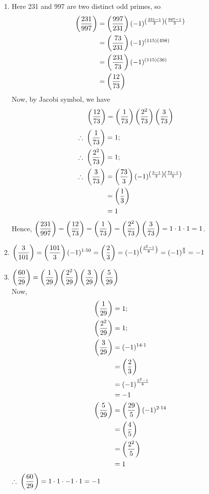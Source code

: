 \documentclass[12pt,class=book,crop=false]{standalone}
\begin{document}
\begin{soln}
    \hfill
    \begin{enumerate}
        \item Here 231 and 997 are two distinct odd primes, so
        \begin{align*}
            \left( \frac{231}{997} \right)&=\left( \frac{997}{231} \right)(-1)^{\left( \frac{231-1}{2} \right)\left( \frac{997-1}{2} \right)}\\
            &=\left( \frac{73}{231} \right)(-1)^{(115)(498)}\\
            &=\left( \frac{231}{73} \right)(-1)^{(115)(36)}\\
            &=\left( \frac{12}{73} \right)
        \end{align*}
        Now, by Jacobi symbol, we have
        \[\left( \frac{12}{73} \right)=\left( \frac{1}{73} \right)\left( \frac{2^2}{73} \right)\left( \frac{3}{73} \right)\]
        \begin{align*}
            \therefore\;\left( \frac{1}{73} \right)&=1;\\
            \therefore\;\left( \frac{2^2}{73} \right)&=1;\\
            \therefore\;\left( \frac{3}{73} \right)&=\left( \frac{73}{3} \right)(-1)^{\left( \frac{3-1}{2} \right)\left( \frac{73-1}{2} \right)}\\
            &=\left( \frac{1}{3} \right)\\
            &=1
        \end{align*}
        Hence, $ \displaystyle \left( \frac{231}{997} \right)=\left( \frac{12}{73} \right)=\left( \frac{1}{73} \right)=\left( \frac{2^2}{73} \right)\left( \frac{3}{73} \right)=1\cdot1\cdot1=1 $.
        \item $ \displaystyle \left( \frac{3}{101} \right)=\left( \frac{101}{3} \right)(-1)^{1\cdot 50}=\left( \frac{2}{3} \right)=(-1)^{\left( \frac{3^2-1}{8} \right)}=(-1)^{\frac{8}{9}}=-1 $
        \item $ \displaystyle \left( \frac{60}{29} \right)=\left( \frac{1}{29} \right)\left( \frac{2^2}{29} \right)\left( \frac{3}{29} \right)\left( \frac{5}{29} \right) $\\
        Now,
        \begin{align*}
            \left( \frac{1}{29} \right)&=1;\\
            \left( \frac{2^2}{29} \right)&=1;\\
            \left( \frac{3}{29} \right)&=(-1)^{14\cdot1}\\
            &=\left( \frac{2}{3} \right)\\
            &=(-1)^{\frac{3^2-1}{8}}\\
            &=-1\\
            \left( \frac{5}{29} \right)&=\left( \frac{29}{5} \right)(-1)^{2\cdot14}\\
            &=\left( \frac{4}{5} \right)\\
            &=\left( \frac{2^2}{5} \right)\\
            &=1
        \end{align*}
        $ \displaystyle \therefore\;\left( \frac{60}{29} \right)=1\cdot1\cdot-1\cdot1=-1 $

\end{enumerate}
\end{soln}
\end{document}
